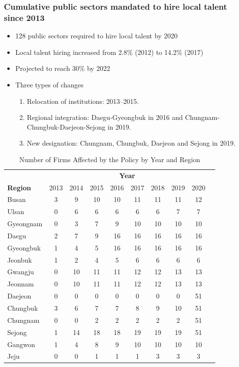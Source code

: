 \documentclass[aspectratio=169,xcolor=dvipsnames,handout]{beamer}
\begin{document}
\begin{frame}[allowframebreaks]
    \frametitle{Cumulative public sectors mandated to hire local talent since 2013}
    \begin{itemize}[<+->]
        \item 128 public sectors required to hire local talent by 2020
        \item Local talent hiring increased from 2.8\% (2012) to 14.2\% (2017)
        \item Projected to reach 30\% by 2022
        \item Three types of changes
        \begin{enumerate}
            \item Relocation of institutions: 2013--2015.
            \item Regional integration: Daegu-Gyeongbuk in 2016 and Chungnam-Chungbuk-Daejeon-Sejong in 2019.
            \item New designation: Chungnam, Chungbuk, Daejeon and Sejong in 2019.
        \end{enumerate}
    \end{itemize}
    \begin{table}[ht]
        \centering
        \scriptsize
        \begin{tabular}{lccccccccc}
        \toprule
        & \multicolumn{8}{c}{\textbf{Year}} \\
        \cline{2-9} 
        \textbf{Region} & 2013 & 2014 & 2015 & 2016 & 2017 & 2018 & 2019 & 2020 \\
        \midrule
        Busan     & 3 & 9  & 10 & 10 & 11 & 11 & 11 & 12 \\
        Ulsan     & 0 & 6  & 6  & 6  & 6  & 6  & 7  & 7  \\
        Gyeongnam & 0 & 3  & 7  & 9  & 10 & 10 & 10 & 10 \\
        Daegu     & 2 & 7  & 9  & 16 & 16 & 16 & 16 & 16 \\
        Gyeongbuk & 1 & 4  & 5  & 16 & 16 & 16 & 16 & 16 \\
        Jeonbuk   & 1 & 2  & 4  & 5  & 6  & 6  & 6  & 6  \\
        Gwangju   & 0 & 10 & 11 & 11 & 12 & 12 & 13 & 13 \\
        Jeonnam   & 0 & 10 & 11 & 11 & 12 & 12 & 13 & 13 \\
        Daejeon   & 0 & 0  & 0  & 0  & 0  & 0  & 0  & 51 \\
        Chungbuk  & 3 & 6  & 7  & 7  & 8  & 9  & 10 & 51 \\
        Chungnam  & 0 & 0  & 2  & 2  & 2  & 2  & 2  & 51 \\
        Sejong    & 1 & 14 & 18 & 18 & 19 & 19 & 19 & 51 \\
        Gangwon   & 1 & 4  & 8  & 9  & 10 & 10 & 10 & 10 \\
        Jeju      & 0 & 0  & 1  & 1  & 1  & 3  & 3  & 3  \\
        \bottomrule
        \end{tabular}
        \caption{Number of Firms Affected by the Policy by Year and Region}
    \end{table}
\end{frame}
\end{document}
